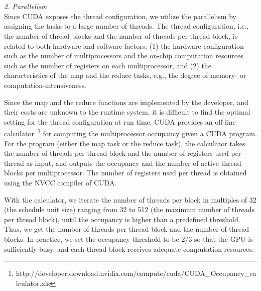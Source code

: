 \\\\
{\em 2. Parallelism}
\\
Since CUDA exposes the thread configuration, we utilize the parallelism by assigning the tasks to
a large number of threads. The thread configuration, i.e., the number of thread blocks and the
number of threads per thread block, is related to both hardware and software factors:
 (1) the hardware configuration such as the number of
multiprocessors and the on-chip computation resources such as the
number of registers on each multiprocessor, and (2) the characteristics of the map and the reduce tasks, e.g., the degree of memory- or computation-intensiveness.

Since the map and the reduce functions are implemented by the
developer, and their costs are unknown to the runtime system, it is
difficult to find the optimal setting for the thread configuration
at run time. CUDA provides an off-line
calculator~\footnote{http://developer.download.nvidia.com/compute/cuda/CUDA\_Occupancy\_calculator.xls}
for computing the multiprocessor occupancy given a CUDA program. For
the program (either the map task or the reduce task), the calculator
takes the number of threads per thread block and the number of
registers used per thread as input, and outputs the occupancy and
the number of active thread blocks per multiprocessor. The number of
registers used per thread is obtained using the NVCC compiler of
CUDA.

With the calculator, we iterate the number of threads per block in
multiples of 32 (the schedule unit size) ranging from 32 to 512 (the
maximum number of threads per thread block), until the occupancy is
higher than a predefined threshold. Thus, we get the number of
threads per thread block and the number of thread blocks. In
practice, we set the occupancy threshold to be 2/3 so that the GPU
is sufficiently busy, and each thread block receives adequate
computation resources.




